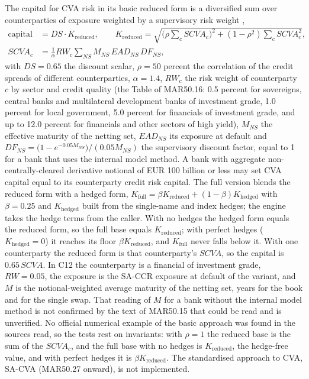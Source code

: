 The capital for CVA risk in its basic reduced form is a diversified sum over counterparties of exposure weighted by a supervisory risk weight \citep{ccr:mar50},
\begin{equation}
\begin{aligned}
\text{capital}&=DS\cdot K_{\mathrm{reduced}},\qquad K_{\mathrm{reduced}}=\sqrt{\Big(\rho\sum_cSCVA_c\Big)^2+(1-\rho^2)\sum_cSCVA_c^2},\\
SCVA_c&=\frac{1}{\alpha}RW_c\sum_{NS}M_{NS}\,EAD_{NS}\,DF_{NS},
\end{aligned}
\label{eq:ccr-bacva}
\end{equation}
with $DS=0.65$ the discount scalar, $\rho=50$ percent the correlation of the credit spreads of different counterparties, $\alpha=1.4$, $RW_c$ the risk weight of counterparty $c$ by sector and credit quality (the Table of MAR50.16: 0.5 percent for sovereigns, central banks and multilateral development banks of investment grade, 1.0 percent for local government, 5.0 percent for financials of investment grade, and up to 12.0 percent for
financials and other sectors of high yield), $M_{NS}$ the effective maturity of the netting set, $EAD_{NS}$ its exposure at default and $DF_{NS}=\big(1-e^{-0.05M_{NS}}\big)/(0.05M_{NS})$ the supervisory discount factor, equal to 1 for a bank that uses the internal model method. A bank with aggregate non-centrally-cleared derivative notional of EUR 100 billion or less may set CVA capital equal to its counterparty credit risk capital.
The full version blends the reduced form with a hedged form, $K_{\mathrm{full}}=\beta K_{\mathrm{reduced}}+(1-\beta)K_{\mathrm{hedged}}$ with $\beta=0.25$ and $K_{\mathrm{hedged}}$ built from the single-name and index hedges; the engine takes the hedge terms from the caller. With no hedges the hedged form equals the reduced form, so the full base equals $K_{\mathrm{reduced}}$; with perfect hedges ($K_{\mathrm{hedged}}=0$) it reaches its floor $\beta K_{\mathrm{reduced}}$, and $K_{\mathrm{full}}$ never falls below it. With one counterparty the reduced form is that
counterparty's $SCVA$, so the capital is $0.65\,SCVA$. In C12 the counterparty is a financial of investment grade, $RW=0.05$, the exposure is the SA-CCR exposure at default of the variant, and $M$ is the notional-weighted average maturity of the netting set, \ccrBaCvaM{} years for the book and \ccrBaCvaMSingle{} for the single swap. That reading of $M$ for a bank without the internal model method is not confirmed by the text of MAR50.15 that could be read and is unverified. No official numerical example of the basic approach was found in the sources read, so the tests rest on invariants: with $\rho=1$ the reduced base is the sum of the $SCVA_c$, and
the full base with no hedges is $K_{\mathrm{reduced}}$, the hedge-free value, and with perfect hedges it is $\beta K_{\mathrm{reduced}}$. The standardised approach to CVA, SA-CVA (MAR50.27 onward), is not implemented.


